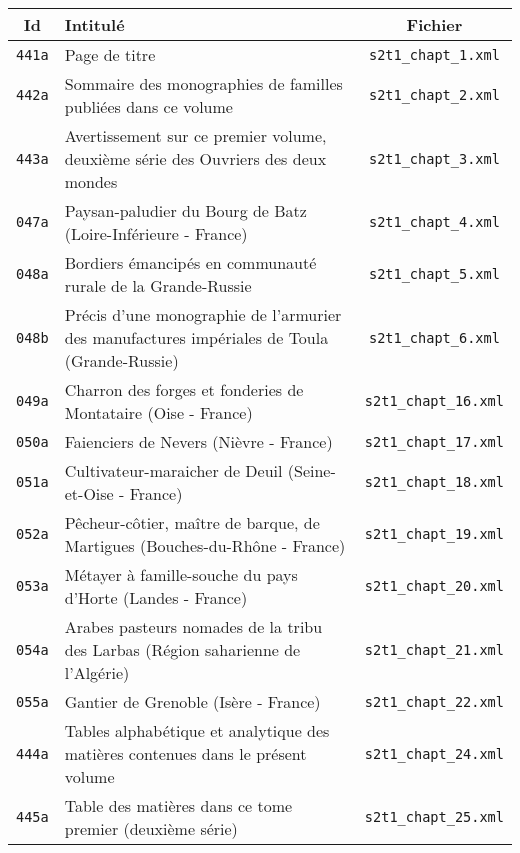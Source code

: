 \begin{center}
\begin{longtable}{ | c | p{9.5cm} | c | }
\hline
Id & Intitulé & Fichier \\ \hline
\texttt{441a} & Page de titre & \texttt{s2t1\_chapt\_1.xml} \\ \hline
\texttt{442a} & Sommaire des monographies de familles publiées dans ce volume & \texttt{s2t1\_chapt\_2.xml} \\ \hline
\texttt{443a} & Avertissement sur ce premier volume, deuxième série des Ouvriers des deux mondes & \texttt{s2t1\_chapt\_3.xml} \\ \hline
\texttt{047a} & Paysan-paludier du Bourg de Batz (Loire-Inférieure - France) & \texttt{s2t1\_chapt\_4.xml} \\ \hline
\texttt{048a} & Bordiers émancipés en communauté rurale de la Grande-Russie & \texttt{s2t1\_chapt\_5.xml} \\ \hline
\texttt{048b} & Précis d'une monographie de l'armurier des manufactures impériales de Toula (Grande-Russie) & \texttt{s2t1\_chapt\_6.xml} \\ \hline
\texttt{049a} & Charron des forges et fonderies de Montataire (Oise - France) & \texttt{s2t1\_chapt\_16.xml} \\ \hline
\texttt{050a} & Faienciers de Nevers (Nièvre - France) & \texttt{s2t1\_chapt\_17.xml} \\ \hline
\texttt{051a} & Cultivateur-maraicher de Deuil (Seine-et-Oise - France) & \texttt{s2t1\_chapt\_18.xml} \\ \hline
\texttt{052a} & Pêcheur-côtier, maître de barque, de Martigues (Bouches-du-Rhône - France) & \texttt{s2t1\_chapt\_19.xml} \\ \hline
\texttt{053a} & Métayer à famille-souche du pays d'Horte (Landes - France) & \texttt{s2t1\_chapt\_20.xml} \\ \hline
\texttt{054a} & Arabes pasteurs nomades de la tribu des Larbas (Région saharienne de l'Algérie) & \texttt{s2t1\_chapt\_21.xml} \\ \hline
\texttt{055a} & Gantier de Grenoble (Isère - France) & \texttt{s2t1\_chapt\_22.xml} \\ \hline
\texttt{444a} & Tables alphabétique et analytique des matières contenues dans le présent volume & \texttt{s2t1\_chapt\_24.xml} \\ \hline
\texttt{445a} & Table des matières dans ce tome premier (deuxième série) & \texttt{s2t1\_chapt\_25.xml} \\ \hline
\end{longtable}
\end{center}


